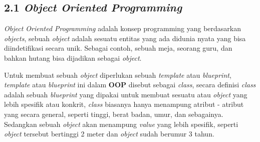 \documentclass[a4paper]{article}
\begin{document}
\subsection*{2.1 \textit{Object Oriented Programming}}
\textit{Object Oriented Programming} adalah konsep programming yang berdasarkan \textit{objects}, sebuah \textit{object} adalah sesuatu entitas yang ada didunia nyata yang bisa diindetifikasi secara unik\autocite{liang_liang_2021}. Sebagai contoh, sebuah meja, seorang guru, dan bahkan hutang bisa dijadikan sebagai \textit{object}. 

Untuk membuat sebuah \textit{object} diperlukan sebuah \textit{template} atau \textit{blueprint}, \textit{template} atau \textit{blueprint} ini dalam \textbf{OOP} disebut sebagai \textit{class}, secara definisi \textit{class} adalah sebuah \textit{blueprint} yang dipakai untuk membuat sesuatu atau \textit{object} yang lebih spesifik atau konkrit\autocite{education-erin-oop-2020}, \textit{class} biasanya hanya menampung atribut - atribut yang secara general, seperti tinggi, berat badan, umur, dan sebagainya. Sedangkan sebuah \textit{object} akan menampung \textit{value} yang lebih spesifik, seperti \textit{object} tersebut bertinggi 2 meter dan \textit{object} sudah berumur 3 tahun.
\end{document}
